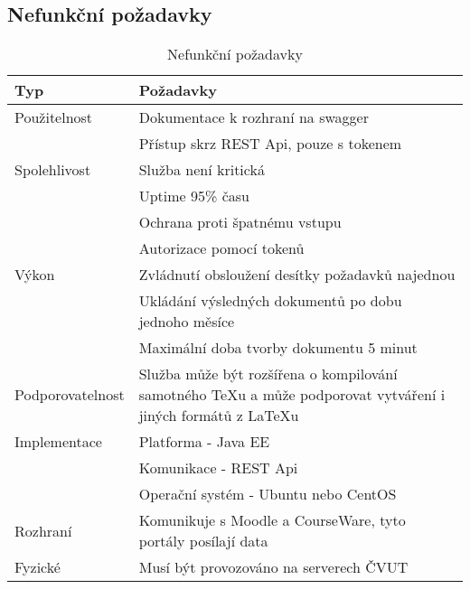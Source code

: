  \subsection{Nefunkční požadavky}
 
 \begin{table}[H]
 	\begin{center}
 		\begin{tabular}{ p{4cm} P{8,6cm} }
 			\textbf{Typ} & \textbf{Požadavky} \\
 			\midrule[0,15em]
 			Použitelnost & \tabitem Dokumentace k rozhraní na swagger\\
 						& \tabitem Přístup skrz REST Api, pouze s tokenem\\
 			\midrule		
 			Spolehlivost & \tabitem Služba není kritická\\
 						& \tabitem Uptime 95\% času\\
 						& \tabitem Ochrana proti špatnému vstupu\\
 						& \tabitem Autorizace pomocí tokenů\\
 			\midrule
 			Výkon & \tabitem Zvládnutí obsloužení desítky požadavků najednou\\
 						& \tabitem Ukládání výsledných dokumentů po dobu jednoho měsíce\\
 						& \tabitem Maximální doba tvorby dokumentu 5 minut\\	
			\midrule
			Podporovatelnost & \tabitem Služba může být rozšířena o kompilování samotného TeXu a může podporovat vytváření i jiných formátů z \LaTeX u\\	
			\midrule
			Implementace & \tabitem Platforma - Java EE\\
						& \tabitem Komunikace - REST Api\\
						& \tabitem Operační systém - Ubuntu nebo CentOS\\
			\midrule
 			Rozhraní & \tabitem Komunikuje s Moodle a CourseWare, tyto portály posílají data\\
 			\midrule
 			Fyzické & \tabitem Musí být provozováno na serverech ČVUT\\
 	\end{tabular}
 	\end{center}
 	\caption{Nefunkční požadavky}
 	\label{tab:errors}
 \end{table}
 
